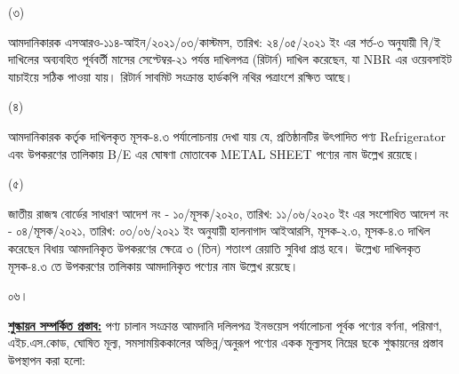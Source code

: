 \documentclass[12pt]{article}
\newcommand{\product}{Refrigerator}
\newcommand{\good}{METAL SHEET}
\newcommand{\musokr}{সেপ্টেম্বর-২১}
\newcommand{\srooof}{এসআরও-১১৪-আইন/২০২১/০৩/কাস্টমস}
\newcommand{\srooofd}{তারিখ: ২৪/০৫/২০২১ ইং}
\begin{document}
\begin{minipage}[t]{0.05\linewidth}
(৩)
\end{minipage}
\begin{minipage}[t]{0.90\linewidth}
আমদানিকারক {\srooof}, {\srooofd} এর
শর্ত-৩ অনুযায়ী বি/ই দাখিলের অব্যবহিত
পূর্ববর্তী মাসের {\musokr} পর্যন্ত দাখিলপত্র
(রিটার্ন) দাখিল করেছেন, যা NBR এর ওয়েবসাইট
যাচাইয়ে সঠিক পাওয়া যায়। রিটার্ন সাবমিট
সংক্রান্ত হার্ডকপি নথির পত্রাংশে রক্ষিত আছে।
\\
\end{minipage}
\begin{minipage}[t]{0.05\linewidth}
\hspace{0em}
\end{minipage}
\begin{minipage}[t]{0.05\linewidth}
(৪)
\end{minipage}
\begin{minipage}[t]{0.90\linewidth}
আমদানিকারক কর্তৃক দাখিলকৃত মূসক-৪.৩
পর্যালোচনায় দেখা যায় যে, প্রতিষ্ঠানটির উৎপাদিত
পণ্য {\product} এবং উপকরণের তালিকায়
B/E এর ঘোষণা মোতাবেক {\good} পণ্যের নাম
উল্লেখ রয়েছে।
\\
\end{minipage}
\begin{minipage}[t]{0.05\linewidth}
\hspace{0em}
\end{minipage}
\begin{minipage}[t]{0.05\linewidth}
(৫)
\end{minipage}
\begin{minipage}[t]{0.90\linewidth}
জাতীয় রাজস্ব বোর্ডের সাধারণ আদেশ নং -
১০/মূসক/২০২০, তারিখ: ১১/০৬/২০২০ ইং
এর সংশোধিত আদেশ নং -
০৪/মূসক/২০২১, তারিখ: ০৩/০৬/২০২১ ইং
অনুযায়ী হালনাগাদ আইআরসি, মূসক-২.৩,
মূসক-৪.৩ দাখিল করেছেন বিধায় আমদানিকৃত
উপকরণের ক্ষেত্রে ৩ (তিন) শতাংশ রেয়াতি
সুবিধা প্রাপ্ত হবে।
উল্লেখ্য দাখিলকৃত মূসক-৪.৩ তে উপকরণের
তালিকায় আমদানিকৃত পণ্যের নাম উল্লেখ রয়েছে।
\\
\end{minipage}
\begin{minipage}[t]{0.05\linewidth}
০৬।
\end{minipage}
\begin{minipage}[t]{0.95\linewidth}
\underline{\textbf{শুল্কায়ন সম্পর্কিত প্রস্তাব:}}
পণ্য চালান সংক্রান্ত আমদানি দলিলপত্র
ইনভয়েস পর্যালোচনা পূর্বক পণ্যের বর্ণনা, পরিমাণ, এইচ.এস.কোড, ঘোষিত মূল্য,
সমসাময়িককালের অভিন্ন/অনুরূপ পণ্যের একক মূল্যসহ নিম্নের ছকে শুল্কায়নের প্রস্তাব উপস্থাপন
করা হলো:
\end{minipage}
\end{document}
